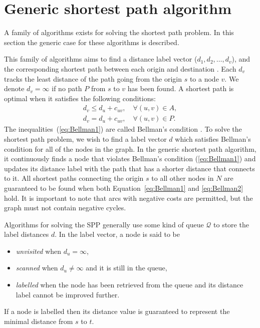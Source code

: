 
\section{Generic shortest path algorithm}
A family of algorithms exists for solving the shortest path problem.
In this section the generic case for these algorithms is described.

This family of algorithms aims to find a 
distance label vector ($d_1, d_2,\dots, d_v$),
and the corresponding shortest path between each origin and destination \citep{Klunder}.
Each $d_v$ tracks the least distance of the path going from the origin $s$ to a node $v$.
We denote $d_v = \infty$ if no path $P$ from $s$ to $v$ has been found.
A shortest path is optimal when it satisfies the following conditions:
\begin{align}
    d_v \leq d_u + c_{uv}, \quad \forall(u,v) \in A, \label{eq:Bellman1}\\
    d_v  =   d_u + c_{uv}, \quad \forall(u,v) \in P. \label{eq:Bellman2}
\end{align}
The inequalities~(\ref{eq:Bellman1}) are called Bellman's condition \citep{Bellman}.
To solve the shortest path problem,
we wish to find a label vector $d$ which satisfies Bellman's condition for all of the nodes in the graph.
In the generic shortest path algorithm,
it continuously finds a node that violates Bellman's condition (\ref{eq:Bellman1}) and updates its distance label with the path that has a shorter distance that connects to it.
All shortest paths connecting the origin $s$ to all other nodes in $N$ are guaranteed to be found when both Equation~\eqref{eq:Bellman1} and \eqref{eq:Bellman2} hold.
It is important to note that arcs with negative costs are permitted,
but the graph must not contain negative cycles.

Algorithms for solving the SPP generally use some kind of queue $\mathcal{Q}$ to store the label distances $d$.
In the label vector,
a node is said to be 
\begin{itemize}
    \item \emph{unvisited} when $d_u = \infty$,
    \item \emph{scanned} when $d_u \neq \infty$ and it is still in the queue,
    \item \emph{labelled} when the node has been retrieved from the queue and its distance label cannot be improved further.
\end{itemize}
If a node is labelled then its distance value is guaranteed to represent the minimal distance from $s$ to $t$.

